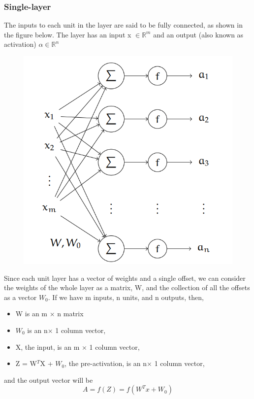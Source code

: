\subsubsection{Single-layer}
  The  inputs to each unit in the layer are said to be fully connected, as shown in the figure below.  The layer has an input x $\in\mathbb{R}^m$ and an output (also known as activation) $\alpha\in\mathbb{R}^n$
\begin{figure}[H]
    \centering
    \includegraphics[scale=0.3]{Figure/ml_2.png}
    \label{fig:my_label}
\end{figure}
Since each unit layer has a vector of weights and a single offset, we can consider the weights of
the whole layer as a matrix, W, and the collection of all the offsets as a vector $W_0$. If we
have m inputs, n units, and n outputs, then,
\begin{itemize}
    \item  W is an m $\times$ n matrix
     \item $W_0$ is an n$\times$  1 column vector,
     \item X, the input, is an m $\times$  1 column vector,
     \item Z = W$^T$X + $W_0$, the pre-activation, is an n$\times$  1 column vector,
\end{itemize}
and the output vector will be\\
\begin{equation*}
    A = f(Z) = f(W^Tx +W_0)
\end{equation*}

